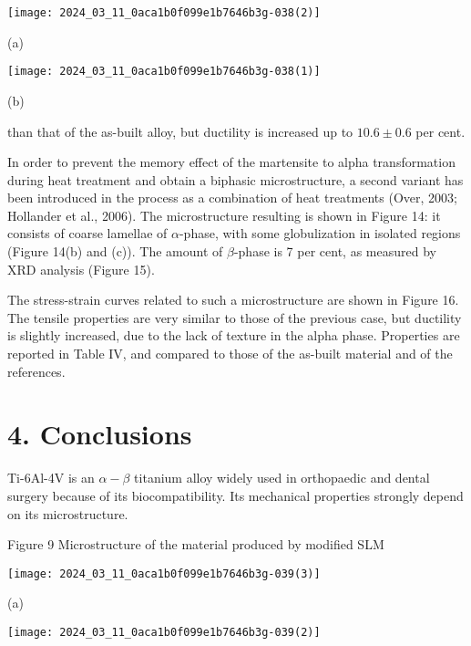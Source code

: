 \documentclass[10pt]{article}
\begin{document}
\begin{center}
\texttt{[image: 2024\_03\_11\_0aca1b0f099e1b7646b3g-038(2)]}
\end{center}

(a)

\begin{center}
\texttt{[image: 2024\_03\_11\_0aca1b0f099e1b7646b3g-038(1)]}
\end{center}

(b)

than that of the as-built alloy, but ductility is increased up to $10.6 \pm 0.6$ per cent.

In order to prevent the memory effect of the martensite to alpha transformation during heat treatment and obtain a biphasic microstructure, a second variant has been introduced in the process as a combination of heat treatments (Over, 2003; Hollander et al., 2006). The microstructure resulting is shown in Figure 14: it consists of coarse lamellae of $\alpha$-phase, with some globulization in isolated regions (Figure 14(b) and (c)). The amount of $\beta$-phase is 7 per cent, as measured by XRD analysis (Figure 15).

The stress-strain curves related to such a microstructure are shown in Figure 16. The tensile properties are very similar to those of the previous case, but ductility is slightly increased, due to the lack of texture in the alpha phase. Properties are reported in Table IV, and compared to those of the as-built material and of the references.

\section*{4. Conclusions}
Ti-6Al-4V is an $\alpha-\beta$ titanium alloy widely used in orthopaedic and dental surgery because of its biocompatibility. Its mechanical properties strongly depend on its microstructure.

Figure 9 Microstructure of the material produced by modified SLM

\begin{center}
\texttt{[image: 2024\_03\_11\_0aca1b0f099e1b7646b3g-039(3)]}
\end{center}

(a)

\begin{center}
\texttt{[image: 2024\_03\_11\_0aca1b0f099e1b7646b3g-039(2)]}
\end{center}
\end{document}
